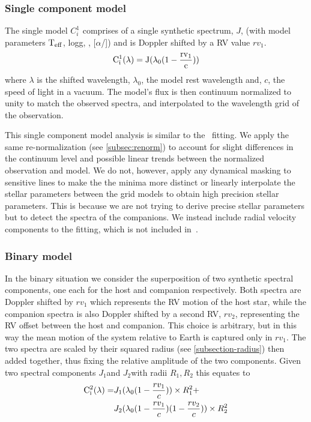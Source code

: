 \subsubsection{Single component model}
\label{subsubsec:single-model}
The single model \(C^{1}_{i}\) comprises of a single synthetic spectrum, \(J\), (with model parameters \(\textrm{T}_{\mathrm{eff}}{}\), logg, \feh{}, [\(\alpha\)/]) and is Doppler shifted by a {RV} value \({rv}_1\).
\begin{equation}
\rm C^{1}_{i}(\lambda) = J(\lambda_0(1-\frac{{rv}_1}{c}))
\end{equation}
where \(\lambda\) is the shifted wavelength, \(\lambda_0\), the model rest wavelength and, \(c\), the speed of light in a vacuum.
The model's flux is then continuum normalized to unity to match the observed spectra, and interpolated to the wavelength grid of the observation.

This single component model analysis is similar to the~\citet{passegger_fundamental_2016} \textchisquared{} fitting.
We apply the same re-normalization (see \cref{subsec:renorm}) to account for slight differences in the continuum level and possible linear trends between the normalized observation and model.
We do not, however, apply any dynamical masking to sensitive lines to make the the \textchisquared{} minima more distinct or linearly interpolate the stellar parameters between the grid models to obtain high precision stellar parameters.
This is because we are not trying to derive precise stellar parameters but to detect the spectra of the companions.
We instead include radial velocity components to the \textchisquared{} fitting, which is not included in~\citet{passegger_fundamental_2016}.


\subsubsection{Binary model}
\label{subsubsec:binary-model}
In the binary situation we consider the superposition of two synthetic spectral components, one each for the host and companion respectively.
Both spectra are Doppler shifted by \({rv}_1\) which represents the {RV} motion of the host star, while the companion spectra is also Doppler shifted by a second {RV}, \({rv}_2\), representing the {RV} offset between the host and companion.
This choice is arbitrary, but in this way the mean motion of the system relative to Earth is captured only in \({rv}_1\).
The two spectra are scaled by their squared radius (see \cref{subsection-radius}) then added together, thus fixing the relative amplitude of the two components.
Given two spectral components \(J_{1}\)and \(J_{2}\)with radii \(R_1, R_2\) this equates to
\begin{align}
\rm C^{2}_{i}(\lambda) = &  J_{1}(\lambda_{0}(1 - \frac{rv_{1}}{c}))\times R_{1}^2 +\nonumber \\
& J_{2}(\lambda_{0}(1-\frac{rv_{1}}{c})(1-\frac{rv_{2}}{c}))\times R_{2}^2
\end{align}


